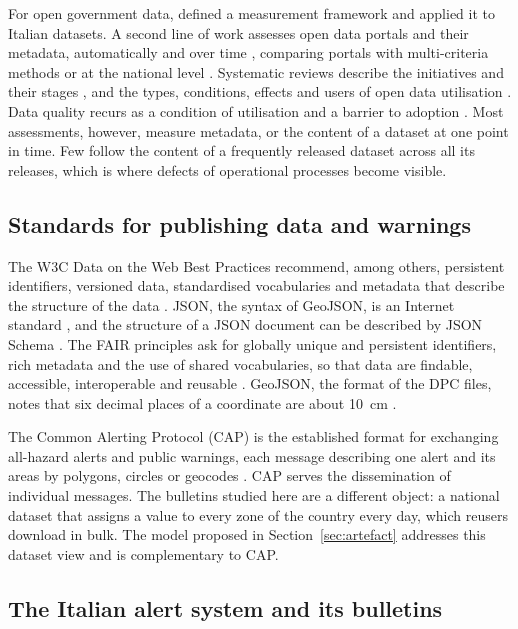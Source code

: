 \documentclass[review,authoryear,12pt]{elsarticle}
\begin{document}
For open government data, \citet{vetro2016} defined a measurement framework
and applied it to Italian datasets. A second line of work assesses open data
portals and their metadata, automatically and over time
\citep{umbrich2015,neumaier2016}, comparing portals with multi-criteria
methods \citep{kubler2018} or at the national level \citep{machova2017}.
Systematic reviews describe the initiatives and their stages
\citep{attard2015}, and the types, conditions, effects and users of open data
utilisation \citep{safarov2017}. Data quality recurs as a condition of
utilisation and a barrier to adoption \citep{janssen2012,safarov2017}. Most
assessments, however, measure metadata, or the content of a dataset at one
point in time. Few follow the content of a frequently released dataset across
all its releases, which is where defects of operational processes become
visible.

\subsection{Standards for publishing data and warnings}

The W3C Data on the Web Best Practices recommend, among others, persistent
identifiers, versioned data, standardised vocabularies and metadata that
describe the structure of the data \citep{loscio2017}. JSON, the syntax of
GeoJSON, is an Internet standard \citep{bray2017}, and the structure of a JSON
document can be described by JSON Schema \citep{pezoa2016}. The FAIR principles
ask for globally unique and persistent identifiers, rich metadata and the use
of shared vocabularies, so that data are findable, accessible, interoperable
and reusable \citep{wilkinson2016}. GeoJSON, the format of the DPC files, notes
that six decimal places of a coordinate are about 10~cm
\citep[section 11.2]{butler2016}.

The Common Alerting Protocol (CAP) is the established format for exchanging
all-hazard alerts and public warnings, each message describing one alert and
its areas by polygons, circles or geocodes \citep{westfall2010}. CAP serves the
dissemination of individual messages. The bulletins studied here are a
different object: a national dataset that assigns a value to every zone of the
country every day, which reusers download in bulk. The model proposed in
Section~\ref{sec:artefact} addresses this dataset view and is complementary to
CAP.

\subsection{The Italian alert system and its bulletins}
\end{document}
